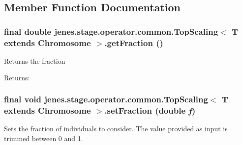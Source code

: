 \subsection{Member Function Documentation}
\hypertarget{classjenes_1_1stage_1_1operator_1_1common_1_1_top_scaling_3_01_t_01extends_01_chromosome_01_4_4cb1be9e4948570a5f5d94ed97eb6cba}{
\subsubsection[getFraction]{\setlength{\rightskip}{0pt plus 5cm}final double jenes.stage.operator.common.TopScaling$<$ T extends Chromosome $>$.getFraction ()}}
\label{classjenes_1_1stage_1_1operator_1_1common_1_1_top_scaling_3_01_t_01extends_01_chromosome_01_4_4cb1be9e4948570a5f5d94ed97eb6cba}


Returns the fraction 

\begin{Desc}
\item[Returns:]\end{Desc}
\hypertarget{classjenes_1_1stage_1_1operator_1_1common_1_1_top_scaling_3_01_t_01extends_01_chromosome_01_4_b39c283ff0bb662ac76df11474ef133f}{
\subsubsection[setFraction]{\setlength{\rightskip}{0pt plus 5cm}final void jenes.stage.operator.common.TopScaling$<$ T extends Chromosome $>$.setFraction (double {\em f})}}
\label{classjenes_1_1stage_1_1operator_1_1common_1_1_top_scaling_3_01_t_01extends_01_chromosome_01_4_b39c283ff0bb662ac76df11474ef133f}


Sets the fraction of individuals to consider. The value provided as input is trimmed between 0 and 1. 

